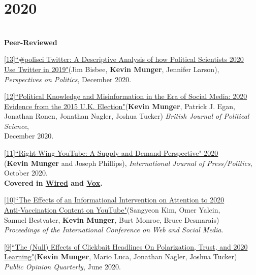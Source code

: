 \documentclass[margin]{res}
\begin{document}
{\section{ 2020} 

\hfill\\
\textbf{Peer-Reviewed}




\href{https://doi.org/10.1017/S1537592720003643}{[13]``\#polisci Twitter: A Descriptive Analysis of how Political Scientists \hfill 2020\\ Use Twitter in 2019"}(Jim Bisbee, \textbf{Kevin Munger}, Jennifer Larson),\\ \textit{Perspectives on Politics}, December 2020.


			\href{https://doi.org/10.1017/S0007123420000198}{[12]``Political Knowledge and Misinformation in the Era of Social Media: \hfill 2020\\ Evidence from the 2015 U.K. Election"}(\textbf{Kevin Munger}, Patrick J. Egan,\\ Jonathan Ronen, Jonathan Nagler, Joshua Tucker) \textit{British Journal of Political Science},\\ December 2020.



\href{https://doi.org/10.1177/1940161220964767}{[11]``Right-Wing YouTube: A Supply and Demand Perspective" \hfill 2020\\}(\textbf{Kevin Munger} and Joseph Phillips), \textit{International Journal of Press/Politics},\\ October 2020.\\
\footnotesize{\textbf{Covered in  
\href{https://www.wired.com/story/not-youtubes-algorithm-radicalizes-people/}{Wired} and \href{https://www.vox.com/recode/2020/11/3/21545053/trump-youtube-campaign-homepage-advertisements}{Vox}.}}
\normalsize


\href{https://aaai.org/ojs/index.php/ICWSM/article/view/7364/7218}{[10]``The Effects of an Informational Intervention on Attention to \hfill 2020\\  Anti-Vaccination Content on YouTube"}(Sangyeon Kim, Omer Yalcin, \\ Samuel Bestvater, \textbf{Kevin Munger}, Burt Monroe, Bruce Desmarais)\\ \textit{Proceedings of the International Conference on Web and Social Media}.


\href{https://doi.org/10.1093/poq/nfaa008}{[9]``The (Null) Effects of Clickbait Headlines On Polarization, Trust, and \hfill 2020\\  Learning"}(\textbf{Kevin Munger}, Mario Luca, Jonathan Nagler, Joshua Tucker)\\ \textit{Public Opinion Quarterly}, June 2020.


}
\end{document}
